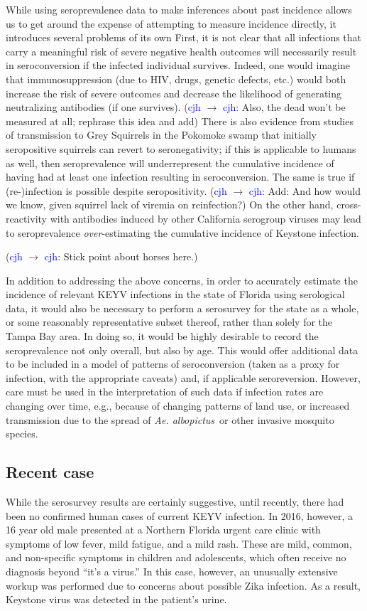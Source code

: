 \documentclass[12pt]{article}
\newcommand{\alb}{\textit{Ae. albopictus}}
\newcommand{\cjh}{\textcolor{blue}{cjh}}
\newcommand{\msg}[3]{(#1 $\rightarrow$ #2: #3)}
\newcommand{\mcc}[1]{\msg\cjh\cjh{#1}}
\begin{document}
        While using seroprevalence data to make inferences about past incidence allows us to get around the expense of attempting to measure incidence directly, it introduces several problems of its own First, it is not clear that all infections that carry a meaningful risk of severe negative health outcomes will necessarily result in seroconversion if the infected individual survives. Indeed, one would imagine that immunosuppression (due to HIV, drugs, genetic defects, etc.) would both increase the risk of severe outcomes and decrease the likelihood of generating neutralizing antibodies (if one survives). \mcc{Also, the dead won't be measured at all; rephrase this idea and add} There is also evidence from studies of transmission to Grey Squirrels in the Pokomoke swamp\cite{asdf} that initially seropositive squirrels can revert to seronegativity; if this is applicable to humans as well, then seroprevalence will underrepresent the cumulative incidence of having had at least one infection resulting in seroconversion. The same is true if (re-)infection is possible despite seropositivity. \mcc{Add: And how would we know, given squirrel lack of viremia on reinfection?} On the other hand, cross-reactivity with antibodies induced by other California serogroup viruses may lead to seroprevalence \textit{over}-estimating the cumulative incidence of Keystone infection.

        \mcc{Stick point about horses here.}

        In addition to addressing the above concerns, in order to accurately estimate the incidence of relevant KEYV infections in the state of Florida using serological data, it would also be necessary to perform a serosurvey for the state as a whole, or some reasonably representative subset thereof, rather than solely for the Tampa Bay area. In doing so, it would be highly desirable to record the seroprevalence not only overall, but also by age. This would offer additional data to be included in a model of patterns of seroconversion (taken as a proxy for infection, with the appropriate caveats) and, if applicable seroreversion. However, care must be used in the interpretation of such data if infection rates are changing over time, e.g., because of changing patterns of land use, or increased transmission due to the spread of \alb\ or other invasive mosquito species.

        \subsection{Recent case}
            \label{recent-case}
            While the serosurvey results are certainly suggestive, until recently, there had been no confirmed human cases of current KEYV infection. In 2016, however, a 16 year old male presented at a Northern Florida urgent care clinic with symptoms of low fever, mild fatigue, and a mild rash. These are mild, common, and non-specific symptoms in children and adolescents, which often receive no diagnosis beyond ``it's a virus.'' In this case, however, an unusually extensive workup was performed due to concerns about possible Zika infection. As a result, Keystone virus was detected in the patient's urine.\cite{lednicky2018keystone}
        
\end{document}
